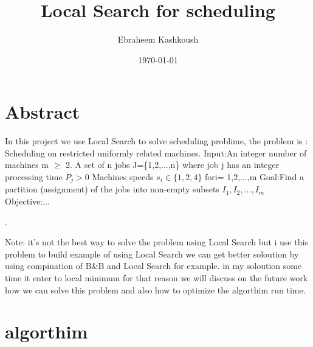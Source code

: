 \documentclass[a4paper,12pt]{report}
\begin{document}
  
  \title{Local Search for scheduling }
\author{Ebraheem Kashkoush}
\date{\today}
\maketitle
  \section{Abstract}
In this project we use Local Search to solve scheduling problime, the problem is : \newline
Scheduling on restricted uniformly related machines.\newline 
Input:An integer number of machines m $\geq$ 2. A set of n jobs J=\{1,2,...,n\} 
where job j has an integer processing time  $P_j > 0$ Machines speeds $s_i \in \{1,2,4\}$  fori= 1,2,...,m\newline
Goal:Find a partition (assignment) of the jobs into non-empty subsets $I_1,I_2,...,I_m$
Objective:...\par . \newline
 
Note: it's not the best way to solve the problem using Local Search but i use this problem to build  example of using Local Search we can get better soloution by using compination of B\&B and Local Search for example.\newline
in my soloution some time it enter to local minimum for that reason we will discuss on the future work how we can solve this problem and also how to optimize the algorthim run time.\par 

  \section{algorthim}
\end{document}
